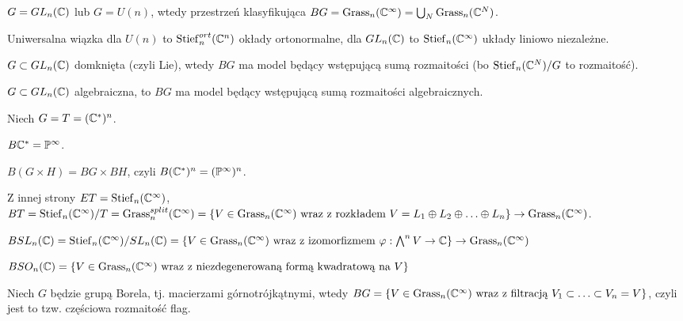 

 

 \begin{twierdzenie}
  $G= GL_n({\mathbb{C}})$ lub $G=U(n)$, wtedy przestrzeń klasyfikująca $BG={\mathrm{Grass}}_n({\mathbb{C}}^\infty) = \bigcup_N {\mathrm{Grass}}_n({\mathbb{C}}^N)$.
  
  Uniwersalna wiązka dla $U(n)$ to ${\mathrm{Stief}}_n^{ort}({\mathbb{C}}^n)$ okłady ortonormalne, dla $GL_n({\mathbb{C}})$ to ${\mathrm{Stief}}_n({\mathbb{C}}^\infty)$ układy liniowo niezależne.
 \end{twierdzenie}
 
 \begin{wniosek}
  $G\subset GL_n({\mathbb{C}})$ domknięta (czyli Lie), wtedy $BG$ ma model będący wstępującą sumą rozmaitości (bo ${\mathrm{Stief}}_n({\mathbb{C}}^N)/G$ to rozmaitość).
 \end{wniosek}
 
 \begin{wniosek}
  $G \subset GL_n({\mathbb{C}})$ algebraiczna, to $BG$ ma model będący wstępującą sumą rozmaitości algebraicznych.
 \end{wniosek}
 
 \begin{przyklad}
  Niech $G=T=({\mathbb{C}}^\ast)^n$.
 
  $B {\mathbb{C}}^\ast = {\mathbb{P}}^\infty$.
  
  $B(G \times H) = BG \times BH$, czyli $B({\mathbb{C}}^\ast)^n = ({\mathbb{P}}^\infty)^n$.
  
  Z innej strony $ET={\mathrm{Stief}}_n({\mathbb{C}}^\infty)$, $BT={\mathrm{Stief}}_n({\mathbb{C}}^\infty)/T={\mathrm{Grass}}_n^{split}({\mathbb{C}}^\infty) = \{ V \in {\mathrm{Grass}}_n({\mathbb{C}}^\infty)\text{ wraz z rozkładem } V = L_1 \oplus L_2 \oplus \ldots \oplus L_n\} \to {\mathrm{Grass}}_n({\mathbb{C}}^\infty)$.
 \end{przyklad}
 
 \begin{przyklad}
  $BSL_n({\mathbb{C}}) = {\mathrm{Stief}}_n({\mathbb{C}}^\infty)/SL_n({\mathbb{C}}) = \{ V \in {\mathrm{Grass}}_n({\mathbb{C}}^\infty)\text{ wraz z izomorfizmem }\varphi: \bigwedge^n V \to {\mathbb{C}} \} \to {\mathrm{Grass}}_n({\mathbb{C}}^\infty)$
 \end{przyklad}
 
 \begin{przyklad}
  $BSO_n({\mathbb{C}}) = \{ V \in {\mathrm{Grass}}_n({\mathbb{C}}^\infty)\text{ wraz z niezdegenerowaną formą kwadratową na }V\}$
 \end{przyklad}
 
 \begin{przyklad}
  Niech $G$ będzie grupą Borela, tj. macierzami górnotrójkątnymi, wtedy $BG = \{ V \in {\mathrm{Grass}}_n({\mathbb{C}}^\infty)\text{ wraz z filtracją }V_1 \subset \ldots \subset V_n = V\}$, czyli jest to tzw. częściowa rozmaitość flag.
 \end{przyklad}
 
